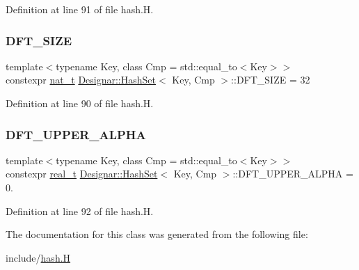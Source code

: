 Definition at line 91 of file hash.\+H.

\mbox{\label{class_designar_1_1_hash_set_a23c3da93ad9449838ab2c78526cd9dbd}} 
\subsubsection{\texorpdfstring{D\+F\+T\+\_\+\+S\+I\+ZE}{DFT\_SIZE}}
{\footnotesize\ttfamily template$<$typename Key, class Cmp = std\+::equal\+\_\+to$<$\+Key$>$$>$ \\
constexpr \hyperlink{namespace_designar_aa72662848b9f4815e7bf31a7cf3e33d1}{nat\+\_\+t} \hyperlink{class_designar_1_1_hash_set}{Designar\+::\+Hash\+Set}$<$ Key, Cmp $>$\+::D\+F\+T\+\_\+\+S\+I\+ZE = 32\hspace{0.3cm}{\ttfamily [static]}}



Definition at line 90 of file hash.\+H.

\mbox{\label{class_designar_1_1_hash_set_ab7e07181f29465aa1457e6abb9397be1}} 
\subsubsection{\texorpdfstring{D\+F\+T\+\_\+\+U\+P\+P\+E\+R\+\_\+\+A\+L\+P\+HA}{DFT\_UPPER\_ALPHA}}
{\footnotesize\ttfamily template$<$typename Key, class Cmp = std\+::equal\+\_\+to$<$\+Key$>$$>$ \\
constexpr \hyperlink{namespace_designar_aca2c32af26808dbec1f3a3071fad25ce}{real\+\_\+t} \hyperlink{class_designar_1_1_hash_set}{Designar\+::\+Hash\+Set}$<$ Key, Cmp $>$\+::D\+F\+T\+\_\+\+U\+P\+P\+E\+R\+\_\+\+A\+L\+P\+HA = 0.\hspace{0.3cm}{\ttfamily [static]}}



Definition at line 92 of file hash.\+H.



The documentation for this class was generated from the following file\+:\begin{DoxyCompactItemize}
\item 
include/\hyperlink{hash_8_h}{hash.\+H}\end{DoxyCompactItemize}
